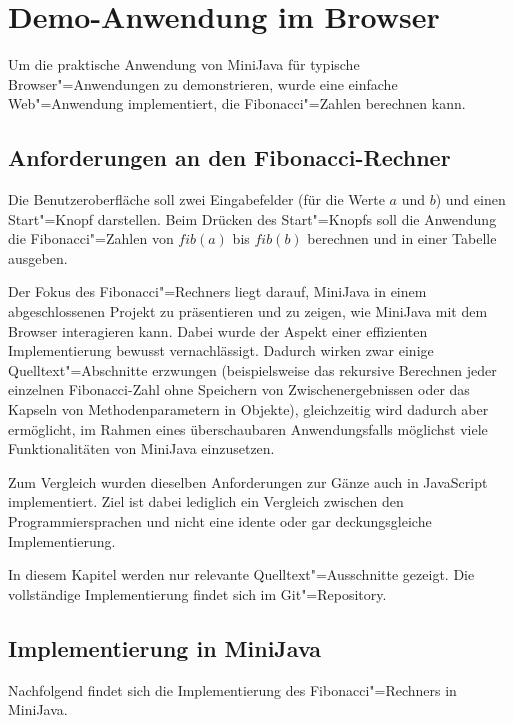 \chapter{Demo-Anwendung im Browser}
\label{cha:DemoAnwendung}

Um die praktische Anwendung von MiniJava für typische Browser"=Anwendungen zu demonstrieren, wurde eine einfache Web"=Anwendung implementiert, die Fibonacci"=Zahlen berechnen kann.

\section{Anforderungen an den Fibonacci-Rechner}
Die Benutzeroberfläche soll zwei Eingabefelder (für die Werte $a$ und $b$) und einen Start"=Knopf darstellen. Beim Drücken des Start"=Knopfs soll die Anwendung die Fibonacci"=Zahlen von $fib(a)$ bis $fib(b)$ berechnen und in einer Tabelle ausgeben.

Der Fokus des Fibonacci"=Rechners liegt darauf, MiniJava in einem abgeschlossenen Projekt zu präsentieren und zu zeigen, wie MiniJava mit dem Browser interagieren kann. Dabei wurde der Aspekt einer effizienten Implementierung bewusst vernachlässigt. Dadurch wirken zwar einige Quelltext"=Abschnitte erzwungen (beispielsweise das rekursive Berechnen jeder einzelnen Fibonacci-Zahl ohne Speichern von Zwischenergebnissen oder das Kapseln von Methodenparametern in Objekte), gleichzeitig wird dadurch aber ermöglicht, im Rahmen eines überschaubaren Anwendungsfalls möglichst viele Funktionalitäten von MiniJava einzusetzen.

Zum Vergleich wurden dieselben Anforderungen zur Gänze auch in JavaScript implementiert. Ziel ist dabei lediglich ein Vergleich zwischen den Programmiersprachen und nicht eine idente oder gar deckungsgleiche Implementierung.

In diesem Kapitel werden nur relevante Quelltext"=Ausschnitte gezeigt. Die vollständige Implementierung findet sich im Git"=Repository.

\pagebreak
\section{Implementierung in MiniJava}

Nachfolgend findet sich die Implementierung des Fibonacci"=Rechners in MiniJava.

\pagebreak




